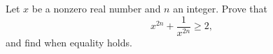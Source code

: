 Let $x$ be a nonzero real number and $n$ an integer. Prove that
\[x^{2n}+\dfrac{1}{x^{2n}}\ge2,\]
and find when equality holds.
